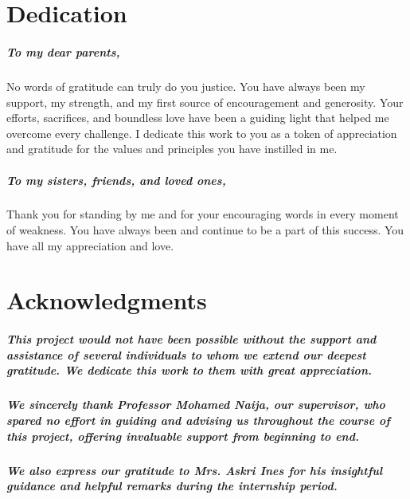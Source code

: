 \documentclass[a4paper,12pt]{report}
\begin{document}

\dominitoc
\chapter*{Dedication}
\paragraph{To my dear parents,}  
No words of gratitude can truly do you justice.  
You have always been my support, my strength, and my first source of encouragement and generosity.  
Your efforts, sacrifices, and boundless love have been a guiding light that helped me overcome every challenge.  
I dedicate this work to you as a token of appreciation and gratitude for the values and principles you have instilled in me.

\paragraph{To my sisters, friends, and loved ones,}  
Thank you for standing by me and for your encouraging words in every moment of weakness.  
You have always been and continue to be a part of this success.  
You have all my appreciation and love.

\newpage

\chapter*{Acknowledgments}
\paragraph{This project would not have been possible without the support and assistance of several individuals to whom we extend our deepest gratitude. We dedicate this work to them with great appreciation.}

\paragraph{We sincerely thank Professor Mohamed Naija, our supervisor, who spared no effort in guiding and advising us throughout the course of this project, offering invaluable support from beginning to end.}

\paragraph{We also express our gratitude to Mrs. Askri Ines for his insightful guidance and helpful remarks during the internship period.}
\end{document}

